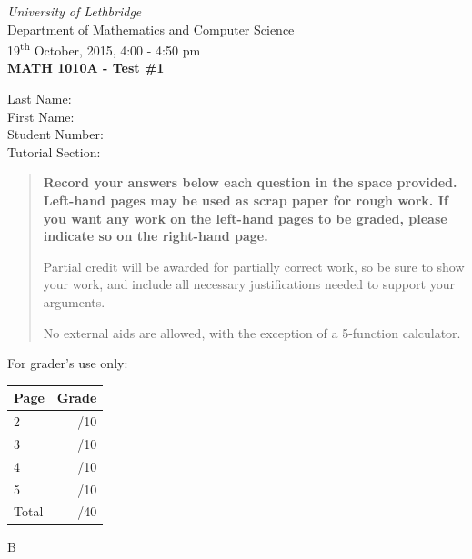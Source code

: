 \documentclass[12pt]{article}
\newcommand{\skipline}{\vspace{12pt}}
\begin{document}
\author{Instructor: Sean Fitzpatrick}
\thispagestyle{plain}
\begin{center}
\emph{University of Lethbridge}\\
Department of Mathematics and Computer Science\\
19\textsuperscript{th} October, 2015, 4:00 - 4:50 pm\\
{\bf MATH 1010A - Test \#1}\\
\end{center}
\skipline \skipline \skipline \noindent \skipline
Last Name:\underline{\hspace{353pt}}\\
\skipline
First Name:\underline{\hspace{350pt}}\\
\skipline
Student Number:\underline{\hspace{323pt}}\\
\skipline
Tutorial Section: \underline{\hspace{320pt}}\\


\vspace{0.5in}


\begin{quote}
 {\bf Record your answers below each question in the space provided.    Left-hand pages may be used as scrap paper for rough work.  If you want any work on the left-hand pages to be graded, please indicate so on the right-hand page.
 
 \bigskip
 
Partial credit will be awarded for partially correct work, so be sure to show your work, and include all necessary justifications needed to support your arguments.

\bigskip

No external aids are allowed, with the exception of a 5-function calculator.}
\end{quote}


\vspace{0.5in}

For grader's use only:

\begin{table}[hbt]
\begin{center}
\begin{tabular}{|l|r|} \hline
Page&Grade\\
\hline \hline
\cline{1-2} 2 & \enspace\enspace\enspace\enspace\enspace\enspace/10\\
\cline{1-2} 3 & \enspace\enspace\enspace\enspace\enspace\enspace/10\\
\cline{1-2} 4 & \enspace\enspace\enspace\enspace\enspace\enspace/10\\
\cline{1-2} 5 & \enspace\enspace\enspace\enspace\enspace\enspace/10\\
\cline{1-2} Total & \enspace\enspace\enspace\enspace\enspace\enspace/40\\
\hline
\end{tabular}

\skipline

\skipline

\skipline

B
\end{center}
\end{table}
\newpage
\end{document}
